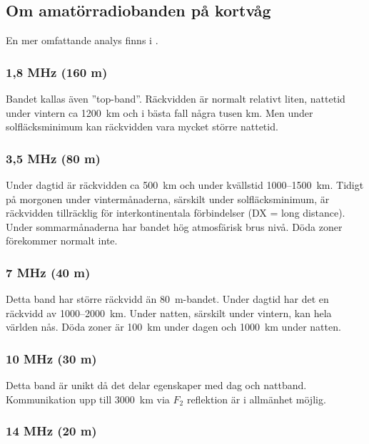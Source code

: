 \subsection{Om amatörradiobanden på kortvåg}

En mer omfattande analys finns i \cite{ARRLHDB2015}.

\subsubsection{1,8 MHz (160 m)}

Bandet kallas även ''top-band''. Räckvidden är normalt relativt liten,
nattetid under vintern ca 1200~km och i bästa fall några tusen km.
Men under solfläcksminimum kan räckvidden vara mycket större nattetid.

\subsubsection{3,5 MHz (80 m)}

Under dagtid är räckvidden ca 500~km och under kvällstid 1000--1500~km.
Tidigt på morgonen under vintermånaderna, särskilt under
solfläcksminimum, är räckvidden tillräcklig för interkontinentala
förbindelser (DX = long distance). Under sommarmånaderna har bandet
hög atmosfärisk brus nivå. Döda zoner förekommer normalt inte.

\subsubsection{7 MHz (40 m)}

Detta band har större räckvidd än 80~m-bandet. Under dagtid har det en
räckvidd av 1000--2000~km. Under natten, särskilt under vintern, kan
hela världen nås. Döda zoner är 100~km under dagen och 1000~km under
natten.

\subsubsection{10 MHz (30 m)}

Detta band är unikt då det delar egenskaper med dag och nattband.
Kommunikation upp till 3000~km via \(F_2\) reflektion är i allmänhet möjlig.

\subsubsection{14 MHz (20 m)}

